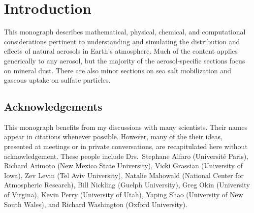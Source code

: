 \documentclass[12pt,twoside]{book}
\begin{document}
\chapter{Introduction}\label{sxn:ntr}

This monograph describes mathematical, physical, chemical, and
computational considerations pertinent to understanding and simulating 
the distribution and effects of natural aerosols in Earth's
atmosphere.
Much of the content applies generically to any aerosol, but the
majority of the aerosol-specific sections focus on mineral dust.
There are also minor sections on sea salt mobilization and gaseous
uptake on sulfate particles.

\section[Acknowledgements]{Acknowledgements}\label{sxn:ack}
This monograph benefits from my discussions with many scientists.
Their names appear in citations whenever possible.
However, many of the their ideas, presented at meetings or in private
conversations, are recapitulated here without acknowledgement. 
These people include Drs.\ 
Stephane Alfaro (Universit\'{e} Paris), 
Richard Arimoto (New Mexico State University),
Vicki Grassian (University of Iowa),
Zev Levin (Tel Aviv University),
Natalie Mahowald (National Center for Atmospheric Research), 
Bill Nickling (Guelph University),
Greg Okin (University of Virgina), 
Kevin Perry (University of Utah),
Yaping Shao (University of New South Wales), and 
Richard Washington (Oxford University). 
\end{document}
